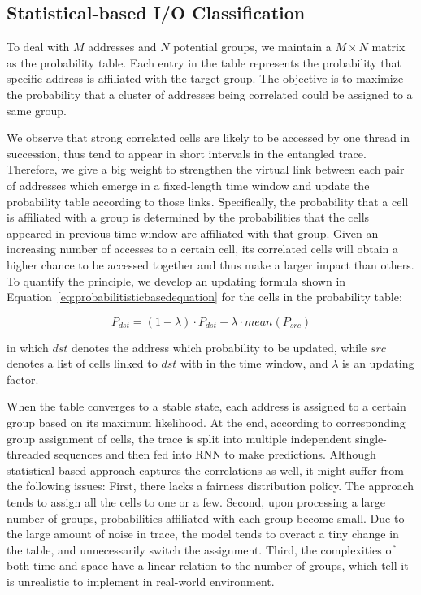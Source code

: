 \subsection{Statistical-based I/O Classification}

To deal with $M$ addresses and $N$ potential groups, we maintain a $M\times N$ matrix
as the probability table.
Each entry in the table represents the probability that specific address is
affiliated with the target group.
The objective is to maximize the probability that a cluster of addresses being
correlated could be assigned to a same group.

We observe that strong correlated cells are likely to be accessed
by one thread in succession, thus tend to appear in short intervals
in the entangled trace.
Therefore, we give a big weight to strengthen the virtual link
between each pair of addresses which emerge in a fixed-length time window
and update the probability table according to those links.
Specifically, the probability that a cell is affiliated with a group is determined by the probabilities that the cells appeared in previous time window are affiliated with that group.
Given an increasing number of accesses to a certain cell,
its correlated cells will obtain a higher chance to be accessed together
and thus make a larger impact than others.
To quantify the principle, we develop an updating formula shown in Equation~\ref{eq:probabilitisticbasedequation} for the cells in the probability table:

\begin{equation}
\label{eq:probabilitisticbasedequation}
P_{dst} = (1 - \lambda) \cdot P_{dst} + \lambda \cdot mean(P_{src})
\end{equation}

in which $dst$ denotes the address which probability to be updated,
while $src$ denotes a list of cells linked to $dst$ with in the time window, and $\lambda$ is an updating factor.

When the table converges to a stable state, each address is assigned to a certain group based on its maximum likelihood.
At the end, according to corresponding group assignment of cells,
the trace is split into multiple independent single-threaded sequences
and then fed into RNN to make predictions.
Although statistical-based approach captures the correlations as well,
it might suffer from the following issues:
First, there lacks a fairness distribution policy.
The approach tends to assign all the cells to one or a few.
Second, upon processing a large number of groups,
probabilities affiliated with each group become small.
Due to the large amount of noise in trace,
the model tends to overact a tiny change in the table,
and unnecessarily switch the assignment.
Third, the complexities of both time and space have a linear relation
to the number of groups, which tell it is unrealistic to implement
in real-world environment.

